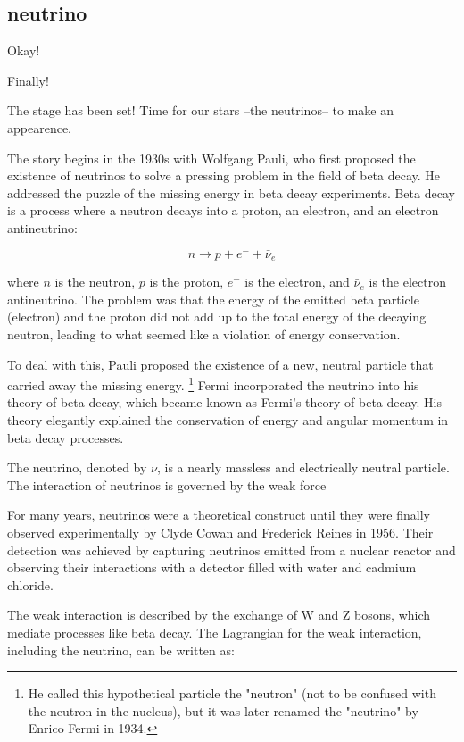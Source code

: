 \subsection{neutrino}

Okay!

Finally!

The stage has been set!
Time for our stars --the neutrinos-- to make an appearence.

The story begins in the 1930s with Wolfgang Pauli, who first proposed the existence of neutrinos to solve a pressing problem in the field of beta decay.
He addressed the puzzle of the missing energy in beta decay experiments.
Beta decay is a process where a neutron decays into a proton, an electron, and an electron antineutrino:

\[
  n \rightarrow p + e^- + \bar{\nu}_e
\]

where \( n \) is the neutron, \( p \) is the proton, \( e^- \) is the electron, and \( \bar{\nu}_e \) is the electron antineutrino.
The problem was that the energy of the emitted beta particle (electron) and the proton did not add up to the total energy of the decaying neutron, leading to what seemed like a violation of energy conservation.

To deal with this, Pauli proposed the existence of a new, neutral particle that carried away the missing energy.
\footnote{He called this hypothetical particle the "neutron" (not to be confused with the neutron in the nucleus), but it was later renamed the "neutrino" by Enrico Fermi in 1934.}
Fermi incorporated the neutrino into his theory of beta decay, which became known as Fermi's theory of beta decay.
His theory elegantly explained the conservation of energy and angular momentum in beta decay processes.

The neutrino, denoted by \( \nu \), is a nearly massless and electrically neutral particle.
The interaction of neutrinos is governed by the weak force

For many years, neutrinos were a theoretical construct until they were finally observed experimentally by Clyde Cowan and Frederick Reines in 1956.
Their detection was achieved by capturing neutrinos emitted from a nuclear reactor and observing their interactions with a detector filled with water and cadmium chloride.

The weak interaction is described by the exchange of W and Z bosons, which mediate processes like beta decay.
The Lagrangian for the weak interaction, including the neutrino, can be written as:

